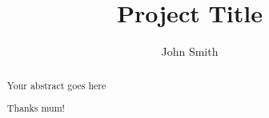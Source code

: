 \documentclass[a4paper, twoside]{report}
\title{Project Title}
\author{John Smith}
\begin{document}


\begin{abstract}
Your abstract goes here
\end{abstract}

\renewcommand{\abstractname}{Acknowledgements}
\begin{abstract}
Thanks mum!
\end{abstract}

\tableofcontents
\listoffigures
\listoftables










\end{document}
